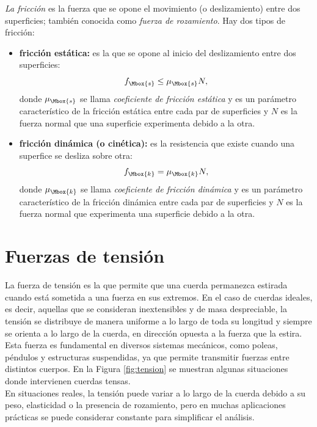 \textit{La fricci\'on} es la fuerza que se opone el movimiento (o deslizamiento) entre dos superficies; tambi\'en conocida como \textit{fuerza de rozamiento}. Hay dos tipos de fricci\'on:
\begin{itemize}
\item[$-$] \textbf{fricci\'on est\'atica:} es la que se opone al inicio del deslizamiento entre dos superficies:
\begin{equation}
f_{\Mbox{s}}\le\mu_{\Mbox{s}}N,
\end{equation}
donde $\mu_{\Mbox{s}}$ se llama \textit{coeficiente de fricci\'on est\'atica} y es un par\'ametro caracter\'istico de la fricci\'on est\'atica entre cada par de superficies y $N$ es la fuerza normal que una superficie experimenta debido a la otra.
\item[$-$] \textbf{fricci\'on din\'amica (o cin\'etica):} es la resistencia que existe cuando una superfice se desliza sobre otra:
\begin{equation}
f_{\Mbox{k}}=\mu_{\Mbox{k}}N,
\end{equation}
donde $\mu_{\Mbox{k}}$ se llama \textit{coeficiente de fricci\'on din\'amica} y es un par\'ametro caracter\'istico de la fricci\'on din\'amica entre cada par de superficies y $N$ es la fuerza normal que experimenta una superficie debido a la otra.
\end{itemize}

\section{Fuerzas de tensi\'on}

La fuerza de tensión es la que permite que una cuerda permanezca estirada cuando está sometida a una fuerza en sus extremos. En el caso de cuerdas ideales, es decir, aquellas que se consideran inextensibles y de masa despreciable, la tensión se distribuye de manera uniforme a lo largo de toda su longitud y siempre se orienta a lo largo de la cuerda, en dirección opuesta a la fuerza que la estira.\\[.35cm]

Esta fuerza es fundamental en diversos sistemas mecánicos, como poleas, péndulos y estructuras suspendidas, ya que permite transmitir fuerzas entre distintos cuerpos.  En la Figura \ref{fig:tension} se muestran algunas situaciones donde intervienen cuerdas tensas.\\[.35cm]

En situaciones reales, la tensión puede variar a lo largo de la cuerda debido a su peso, elasticidad o la presencia de rozamiento, pero en muchas aplicaciones prácticas se puede considerar constante para simplificar el análisis.

